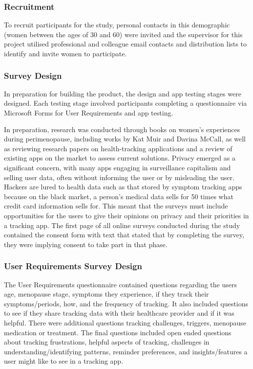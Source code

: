 \subsubsection{Recruitment}
To recruit participants for the study, personal contacts in this demographic (women between the ages of 30 and 60) were invited and the supervisor for this project utilised professional and colleague email contacts and distribution lists to identify and invite women to participate. 

\subsubsection{Survey Design}
In preparation for building the product, the design and app testing stages were designed. Each testing stage involved participants completing a questionnaire via Microsoft Forms for User Requirements and app testing. 

In preparation, research was conducted through books on women’s experiences during perimenopause, including works by Kat Muir\cite{Muir2022} and Davina McCall\cite{McCall2022}, as well as reviewing research papers on health-tracking applications and a review of existing apps on the market to assess current solutions. Privacy emerged as a significant concern, with many apps engaging in surveillance capitalism and selling user data, often without informing the user or by misleading the user\cite{Gilman2021}\cite{FTC2021}. Hackers are lured to health data such as that stored by symptom tracking apps because on the black market, a person's medical data sells for 50 times what credit card information sells for\cite{Rosato2020}. This meant that the surveys must include opportunities for the users to give their opinions on privacy and their priorities in a tracking app. The first page of all online surveys conducted during the study contained the consent form with text that stated that by completing the survey, they were implying consent to take part in that phase. 

\subsubsection{User Requirements Survey Design} 
The User Requirements questionnaire contained questions regarding the users age, menopause stage, symptoms they experience, if they track their symptoms/periods, how, and the frequency of tracking. It also included questions to see if they share tracking data with their healthcare provider and if it was helpful. There were additional questions tracking challenges, triggers, menopause medication or treatment. The final questions included open ended questions about tracking frustrations, helpful aspects of tracking, challenges in understanding/identifying patterns, reminder preferences, and insights/features a user might like to see in a tracking app. 


